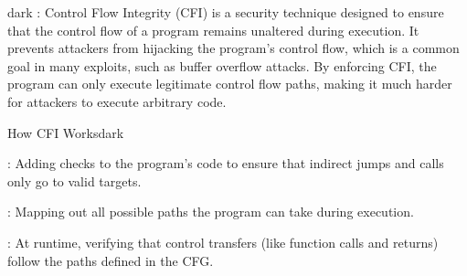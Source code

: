 \label{Control Flow Integrity (CFI)}
\begin{baseBoxThree}{}{dark}
    \bigskip
    : Control Flow Integrity (CFI) is a security technique designed to ensure that the control flow of a program remains unaltered during execution.
    It prevents attackers from hijacking the program's control flow, which is a common goal in many exploits, such as buffer overflow attacks.
    By enforcing CFI, the program can only execute legitimate control flow paths, making it much harder for attackers to execute arbitrary code.
    \bigskip
    \begin{baseBoxThree}{How CFI Works}{dark}
        \smallskip
        \begin{posnexItemize}
            \item[\sA] : Adding checks to the program's code to ensure that indirect jumps and calls only go to valid targets.
            \item[\sA] : Mapping out all possible paths the program can take during execution.
            \item[\sA] : At runtime, verifying that control transfers (like function calls and returns) follow the paths defined in the CFG.
        \end{posnexItemize}
        \smallskip
    \end{baseBoxThree}
    \smallskip
\end{baseBoxThree}

